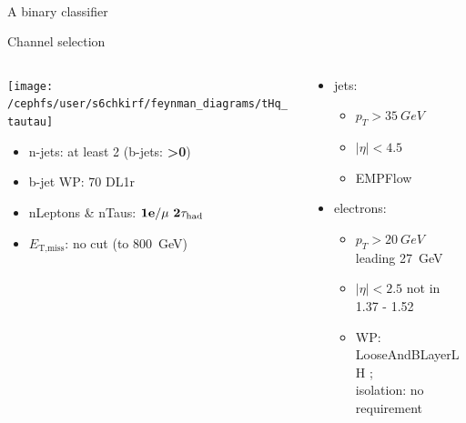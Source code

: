 \begin{frame}
    \begin{center}
        \Huge \tHq \\ A binary classifier
    \end{center}
\end{frame}

\begin{frame}{Channel selection}
    \begin{columns}
      \begin{column}{0.5\textwidth}
        \centering \texttt{[image: /cephfs/user/s6chkirf/feynman\_diagrams/tHq\_tautau]}\\
                \begin{itemize}
          \item n-jets: at least 2 (b-jets: \textbf{>0})
          \item b-jet WP: 70 DL1r
          \item nLeptons \& nTaus: $\bf{1e / \mu~2\tau_{\text{had}}} $
          \item $E_{\text{T,miss}}$: no cut (to \SI{800}{GeV})
        \end{itemize}
      \end{column}
      \begin{column}{0.7\textwidth}
        \vspace*{-0.05\textwidth}
        \begin{itemize}
          \footnotesize
          \item jets:
          \vspace*{-0.02\textwidth}
          \begin{itemize}
            \footnotesize
            \item $p_T>\SI{35}{GeV}$
            \item $|\eta|<4.5$
            \item EMPFlow
          \end{itemize}
          \item electrons:
          \vspace*{-0.02\textwidth}
          \begin{itemize}
            \footnotesize
            \item $p_T>\SI{20}{GeV}$ leading \SI{27}{GeV}
            \item $|\eta|<2.5$ not in 1.37 - 1.52
            \item WP: LooseAndBLayerLH ; \\isolation: no requirement
          \end{itemize}

\end{itemize}
\end{column}
\end{columns}
\end{frame}
